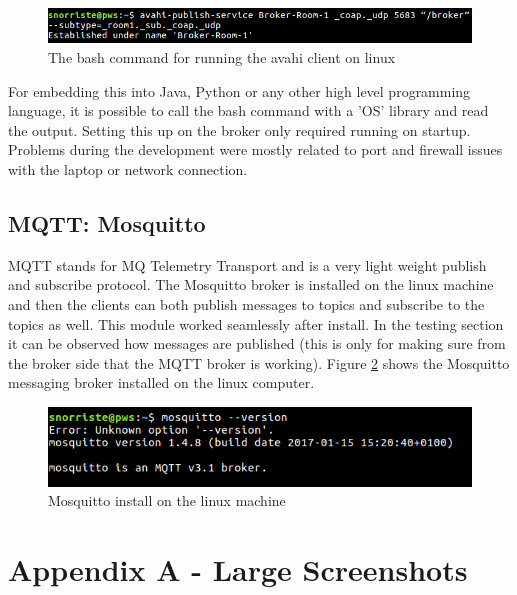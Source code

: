 \documentclass[11pt]{article}
\begin{document}
\begin{figure}[h]
	\begin{center}
		\includegraphics[width=1.1\linewidth]{img/avahi}
		\caption{The bash command for running the avahi client on linux}
		\label{fig:avahi}
	\end{center}
\end{figure}


For embedding this into Java, Python or any other high level programming language, it is possible to call the bash command with a 'OS' library and read the output. Setting this up on the broker only required running on startup. Problems during the development were mostly related to port and firewall issues with the laptop or network connection.

\subsection{MQTT: Mosquitto}
MQTT stands for MQ Telemetry Transport and is a very light weight publish and subscribe protocol. The Mosquitto broker is installed on the linux machine and then the clients can both publish messages to topics and subscribe to the topics as well. This module worked seamlessly after install. In the testing section it can be observed how messages are published (this is only for making sure from the broker side that the MQTT broker is working). Figure \ref{fig:mqtt2} shows the Mosquitto messaging broker installed on the linux computer.

\begin{figure}[h]
	\begin{center}
		\includegraphics[width=.8\linewidth]{img/mqtt2}
		\caption{Mosquitto install on the linux machine}
		\label{fig:mqtt2}
	\end{center}
\end{figure}







\pagebreak

\section{Appendix A - Large Screenshots}
\end{document}
